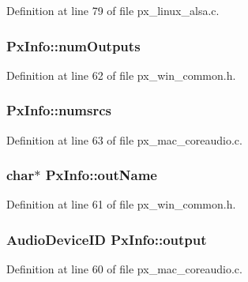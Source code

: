 Definition at line 79 of file px\+\_\+linux\+\_\+alsa.\+c.

\subsubsection[{\texorpdfstring{num\+Outputs}{numOutputs}}]{ Px\+Info\+::num\+Outputs}\hypertarget{struct_px_info_ac6197a5d5f35fd21922e9ffe7bb77daf}{}\label{struct_px_info_ac6197a5d5f35fd21922e9ffe7bb77daf}


Definition at line 62 of file px\+\_\+win\+\_\+common.\+h.

\subsubsection[{\texorpdfstring{numsrcs}{numsrcs}}]{ Px\+Info\+::numsrcs}\hypertarget{struct_px_info_aea47361fc147f8115340e195e312acaa}{}\label{struct_px_info_aea47361fc147f8115340e195e312acaa}


Definition at line 63 of file px\+\_\+mac\+\_\+coreaudio.\+c.

\subsubsection[{\texorpdfstring{out\+Name}{outName}}]{\setlength{\rightskip}{0pt plus 5cm}char$\ast$ Px\+Info\+::out\+Name}\hypertarget{struct_px_info_a0403e41eecac17f2d854a7b972c0718e}{}\label{struct_px_info_a0403e41eecac17f2d854a7b972c0718e}


Definition at line 61 of file px\+\_\+win\+\_\+common.\+h.

\subsubsection[{\texorpdfstring{output}{output}}]{\setlength{\rightskip}{0pt plus 5cm}Audio\+Device\+ID Px\+Info\+::output}\hypertarget{struct_px_info_a7c76d827b0584d2705762fd816165248}{}\label{struct_px_info_a7c76d827b0584d2705762fd816165248}


Definition at line 60 of file px\+\_\+mac\+\_\+coreaudio.\+c.

